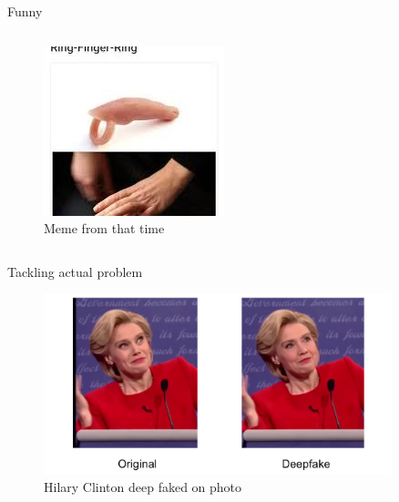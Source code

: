 \documentclass[xcolor=table]{beamer}
\begin{document}
\begin{frame}[containsverbatim]{Funny}
\begin{columns}
\begin{column}{0.5\textwidth}
    \begin{figure}
        \centering
        \includegraphics[width=\textwidth]{img/meme.jpeg}
        \caption{Meme from that time}
    \end{figure}
\end{column}
\end{columns}
\end{frame}


\begin{frame}[containsverbatim]{Tackling actual problem}
    \begin{figure}
        \centering
        \includegraphics[width=0.9\textwidth]{img/deepfake_example.png}
        \caption{Hilary Clinton deep faked on photo}
        \label{fig:hilary-clinton-faceswap}
    \end{figure}
\end{frame}
\end{document}
